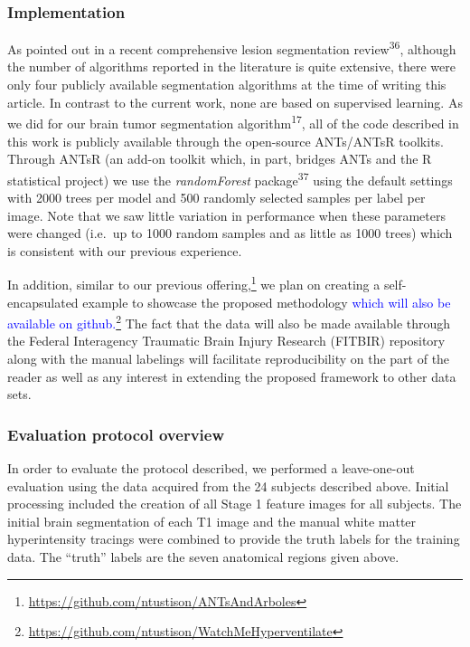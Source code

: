 \documentclass[11pt,]{article}
\let\rmarkdownfootnote\footnote%
\def\footnote{\protect\rmarkdownfootnote}
\begin{document}
\subsubsection{Implementation}\label{implementation}

As pointed out in a recent comprehensive lesion segmentation
review\textsuperscript{36}, although the number of algorithms reported
in the literature is quite extensive, there were only four publicly
available segmentation algorithms at the time of writing this article.
In contrast to the current work, none are based on supervised learning.
As we did for our brain tumor segmentation
algorithm\textsuperscript{17}, all of the code described in this work is
publicly available through the open-source ANTs/ANTsR toolkits. Through
ANTsR (an add-on toolkit which, in part, bridges ANTs and the R
statistical project) we use the \emph{randomForest}
package\textsuperscript{37} using the default settings with 2000 trees
per model and 500 randomly selected samples per label per image. Note
that we saw little variation in performance when these parameters were
changed (i.e.~up to 1000 random samples and as little as 1000 trees)
which is consistent with our previous experience.

In addition, similar to our previous offering,\footnote{\url{https://github.com/ntustison/ANTsAndArboles}}
we plan on creating a self-encapsulated example to showcase the proposed
methodology
\textcolor{blue}{which will also be available on github.}\footnote{\url{https://github.com/ntustison/WatchMeHyperventilate}}
The fact that the data will also be made available through the Federal
Interagency Traumatic Brain Injury Research (FITBIR) repository along
with the manual labelings will facilitate reproducibility on the part of
the reader as well as any interest in extending the proposed framework
to other data sets.

\subsubsection{Evaluation protocol
overview}\label{evaluation-protocol-overview}

In order to evaluate the protocol described, we performed a
leave-one-out evaluation using the data acquired from the 24 subjects
described above. Initial processing included the creation of all Stage 1
feature images for all subjects. The initial brain segmentation of each
T1 image and the manual white matter hyperintensity tracings were
combined to provide the truth labels for the training data. The
``truth'' labels are the seven anatomical regions given above.
\end{document}

